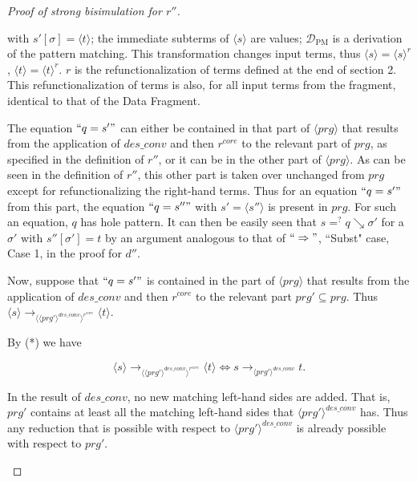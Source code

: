 \begin{proof}[Proof of strong bisimulation for $r''$]
\begin{enumerate}
\begin{prooftree}
\end{prooftree}

with $s'[\sigma] = \langle t \rangle$; the immediate subterms of $\langle s \rangle$ are values; $\mathcal{D}_{\textrm{PM}}$ is a derivation of the pattern matching. This transformation changes input terms, thus $\langle s \rangle = \langle s \rangle^r$, $\langle t \rangle = \langle t \rangle^r$. $r$ is the refunctionalization of terms defined at the end of section 2. This refunctionalization of terms is also, for all input terms from the fragment, identical to that of the Data Fragment.

The equation $`` q = s' "$ can either be contained in that part of $\langle prg \rangle$ that results from the application of $des\_conv$ and then $r^{core}$ to the relevant part of $prg$, as specified in the definition of $r''$, or it can be in the other part of $\langle prg \rangle$. As can be seen in the definition of $r''$, this other part is taken over unchanged from $prg$ except for refunctionalizing the right-hand terms. Thus for an equation $`` q = s' "$ from this part, the equation $`` q = s'' "$ with $s' = \langle s'' \rangle$ is present in $prg$. For such an equation, $q$ has hole pattern. It can then be easily seen that $s =^? q \searrow \sigma'$ for a $\sigma'$ with $s''[\sigma'] = t$ by an argument analogous to that of $`` \Rightarrow "$, ``Subst" case, Case 1, in the proof for $d''$.

Now, suppose that $`` q = s' "$ is contained in the part of $\langle prg \rangle$ that results from the application of $des\_conv$ and then $r^{core}$ to the relevant part $prg' \subseteq prg$. Thus $\langle s \rangle \longrightarrow_{\langle \langle prg' \rangle^{des\_conv} \rangle^{r^{core}}} \langle t \rangle$.

By (*) we have

\begin{equation*}
\langle s \rangle \longrightarrow_{\langle \langle prg' \rangle^{des\_conv} \rangle^{r^{core}}} \langle t \rangle \iff s \longrightarrow_{\langle prg' \rangle^{des\_conv}} t.
\end{equation*}

In the result of $des\_conv$, no new matching left-hand sides are added. That is, $prg'$ contains at least all the matching left-hand sides that $\langle prg' \rangle^{des\_conv}$ has. Thus any reduction that is possible with respect to $\langle prg' \rangle^{des\_conv}$ is already possible with respect to $prg'$.


\end{enumerate}
\end{proof}
